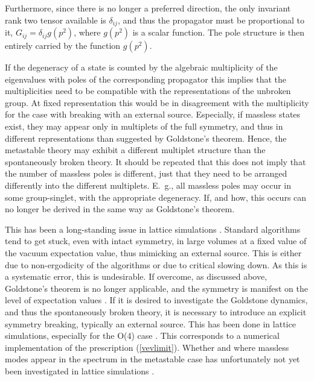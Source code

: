 \documentclass[final,twoside,12pt]{article}
\newcommand*{\pref}[1]{(\ref{#1})}
\newcommand*{\1}{1\!\!\!\bot}
\begin{document}
Furthermore, since there is no longer a preferred direction, the only invariant rank two tensor available is $\delta_{ij}$, and thus the propagator must be proportional to it, $G_{ij}=\delta_{ij}g(p^2)$, where $g(p^2)$ is a scalar function. The pole structure is then entirely carried by the function $g(p^2)$.

If the degeneracy of a state is counted by the algebraic multiplicity of the eigenvalues with poles of the corresponding propagator this implies that the multiplicities need to be compatible with the representations of the unbroken group. At fixed representation this would be in disagreement with the multiplicity for the case with breaking with an external source. Especially, if massless states exist, they may appear only in multiplets of the full symmetry, and thus in different representations than suggested by Goldstone's theorem. Hence, the metastable theory may exhibit a different multiplet structure than the spontaneously broken theory. It should be repeated that this does not imply that the number of massless poles is different, just that they need to be arranged differently into the different multiplets. E.\ g., all massless poles may occur in some group-singlet, with the appropriate degeneracy. If, and how, this occurs can no longer be derived in the same way as Goldstone's theorem. 

This has been a long-standing issue in lattice simulations \cite{Lang:pc}. Standard algorithms tend to get stuck, even with intact symmetry, in large volumes at a fixed value of the vacuum expectation value, thus mimicking an external source. This is either due to non-ergodicity of the algorithms or due to critical slowing down. As this is a systematic error, this is undesirable. If overcome, as discussed above, Goldstone's theorem is no longer applicable, and the symmetry is manifest on the level of expectation values \cite{Lang:pc,Neuberger:1987kt}. If it is desired to investigate the Goldstone dynamics, and thus the spontaneously broken theory, it is necessary to introduce an explicit symmetry breaking, typically an external source. This has been done in lattice simulations, especially for the O(4) case \cite{Luscher:1987ek,Hasenfratz:1988kr,Luscher:1988gc,Hasenfratz:1989ux,Hasenfratz:1990fu,Gockeler:1991sj,Gockeler:1994rx}. This corresponds to a numerical implementation of the prescription \pref{vevlimit}. Whether and where massless modes appear in the spectrum in the metastable case has unfortunately not yet been investigated in lattice simulations \cite{Lang:pc}.
\end{document}
